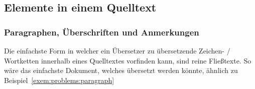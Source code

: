


\newpage




\subsection{Elemente in einem Quelltext}





\subsubsection{Paragraphen, Überschriften und Anmerkungen}\label{subsubsec:problems:texts}%
Die einfachste Form in welcher ein Übersetzer zu übersetzende Zeichen- / Wortketten innerhalb eines Quelltextes vorfinden kann, sind reine Fließtexte. So wäre das einfachste Dokument, welches übersetzt werden könnte, ähnlich zu Beispiel~\ref{exem:problems:paragraph}




